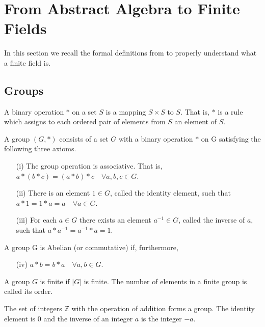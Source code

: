 \chapter{From Abstract Algebra to Finite Fields}
\label{app:A}

In this section we recall the formal definitions from \cite{Menezes97handbookof} to properly understand what a finite field is.

\section{Groups}
\begin{mydef} A binary operation $*$ on a set $S$ is a mapping  $S \times S$ to $S$. That is, $*$ is a rule which assigns to each ordered pair of elements from $S$ an element of $S$. \end{mydef}

\begin{mydef} 
	A group $(G, *)$ consists of a set $G$ with a binary operation $*$ on G satisfying
	the following three axioms.
	\begin{itemize}
		\item[(i)] The group operation is associative. That is, $a* (b * c) = (a* b) * c \quad \forall a, b, c \in G$.
		\item[(ii)] There is an element $1 \in G$, called the identity element, such that $a * 1 = 1 * a = a \quad \forall a \in G$.
		\item[(iii)] For each $a \in G $ there exists an element $a^{-1} \in G$, called the inverse of $a$, such that $a *a^{-1}= a^{-1} * a = 1$.
	\end{itemize}
	A group G is Abelian (or commutative) if, furthermore,
	\begin{itemize}
		\item[(iv)] $a * b = b * a \quad \forall a, b \in G$. 
	\end{itemize}
\end{mydef}

\begin{mydef} 
	A group $G$ is finite if $|G|$ is finite. The number of elements in a finite group is called its order.
\end{mydef}

\begin{myexample} 
	The set of integers $\mathbb{Z}$ with the operation of addition forms a group. 
	The identity element is 0 and the inverse of an integer $a$ is the integer $−a$. \end{myexample}

